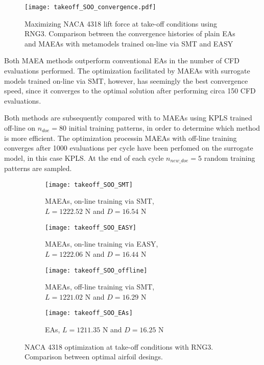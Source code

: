 \begin{figure}[h!]
\centering
\texttt{[image: takeoff\_SOO\_convergence.pdf]}   
\caption{Maximizing NACA 4318 lift force at take-off conditions 
using RNG3. Comparison between the convergence histories of plain 
EAs and MAEAs with metamodels trained on-line via SMT and EASY} 
\label{fig:online_takeoff_SOO}
\end{figure}

Both MAEA methods outperform conventional EAs in the number of CFD 
evaluations performed. The optimization facilitated by MAEAs 
with surrogate models trained on-line via SMT, however, has 
seemingly the best convergence speed, since it converges to the 
optimal solution after performing circa 150 CFD evaluations.

\newpage


Both methods are subsequently compared with to MAEAs using KPLS 
trained off-line on $n_{doe} \!= \!80$ initial training patterns, 
in order to determine which method is more efficient. The 
optimization processin MAEAs with off-line training converges after 
1000 evaluations per cycle have been perfomed on the surrogate 
model, in this case KPLS. At the end of each cycle $n_{new\_doe} = 
5$ random training patterns are sampled.

\begin{figure}[h!]
\centering
	\begin{subfigure}[b]{0.45\textwidth}
	\centering
	\caption{MAEAs, on-line training via SMT, 
	\\  $L \!= \!1222.52$ N and $D \!= \!16.54$ N}
	\texttt{[image: takeoff\_SOO\_SMT]} 
	\end{subfigure}
	\hfill
	\begin{subfigure}[b]{0.45\textwidth}
	\centering
	\caption{MAEAs, on-line training via EASY, 
	\\ $L \!= \!1222.06$ N and $D \!= \!16.44$ N}
	\texttt{[image: takeoff\_SOO\_EASY]}   
	\end{subfigure}
	\hfill
	\begin{subfigure}[b]{0.45\textwidth}
	\centering
	\caption{MAEAs, off-line training via SMT, 
	\\ $L \!= \!1221.02$ N and $D \!= \!16.29$ N}
	\texttt{[image: takeoff\_SOO\_offline]} 
	\end{subfigure}
	\hfill
	\begin{subfigure}[b]{0.45\textwidth}
	\centering
	\caption{EAs, $L \!= \!1211.35$ N and $D \!= \!16.25$ N}
	\texttt{[image: takeoff\_SOO\_EAs]}   
	\end{subfigure}
\caption{NACA 4318 optimization at take-off conditions with RNG3. 
Comparison between optimal airfoil desings.} 
\label{fig:takeoff_SOO_designs}
\end{figure}

